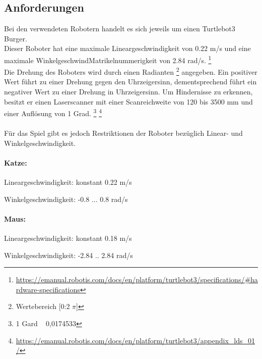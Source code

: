\documentclass[
a4paper,     %
12pt         %
]{scrartcl}  %
\begin{document}
\subsection{Anforderungen}
Bei den verwendeten Robotern handelt es sich jeweils um einen Turtlebot3 Burger.\\ 
Dieser Roboter hat eine maximale Lineargeschwindigkeit von 0.22 m/s und eine maximale WinkelgeschwindMatrikelnummerigkeit von 2.84 rad/s. \footnote{\url{https://emanual.robotis.com/docs/en/platform/turtlebot3/specifications/\#hardware-specifications}}\\
Die Drehung des Roboters wird durch einen Radianten \footnote {Wertebereich [0:2 $\pi$]} angegeben. Ein positiver Wert führt zu einer Drehung gegen den Uhrzeigersinn, dementsprechend führt ein negativer Wert zu einer Drehung in Uhrzeigersinn.
Um Hindernisse zu erkennen, besitzt er einen Laserscanner mit einer Scanreichweite von 120 bis 3500 mm und einer Auflösung von 1 Grad. \footnote {1 Gard ~ 0,0174533} \footnote{\url{https://emanual.robotis.com/docs/en/platform/turtlebot3/appendix_lds_01/}} 
\\\\
Für das Spiel gibt es jedoch Restriktionen der Roboter bezüglich Linear- und Winkelgeschwindigkeit.\\
\paragraph{Katze:}
\begin{description}
 \item Lineargeschwindigkeit: konstant 0.22 m/s
 \item Winkelgeschwindigkeit: -0.8 ... 0.8 rad/s
\end{description}    
\paragraph{Maus:}
\begin{description}
 \item Lineargeschwindigkeit: konstant 0.18 m/s
 \item Winkelgeschwindigkeit: -2.84 .. 2.84 rad/s
\end{description}
\clearpage
\end{document}
